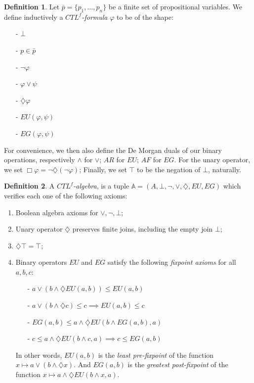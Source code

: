 \documentclass[11pt]{article}
\newcommand{\A}{{\mathbb{A}}}
\newcommand{\dia}{{\diamondsuit}}
\theoremstyle{definition}
\newtheorem*{definition}{Definition}
\begin{document}
\begin{definition}\label{CTLf_formulas}
    Let $\bar{p}= \{p_1,\ldots,p_n \}$ be a finite set of propositional variables. We define inductively 
    a \emph{$CTL^{f}$-formula} $\varphi$ to be of the shape:
    \begin{itemize}
        \setlength\itemsep{0em}
        \item[-] $\bot$
        \item[-] $p \in \bar{p}$
        \item[-] $\neg \varphi$
        \item[-] $\varphi \vee \psi$
        \item[-] $\dia \varphi$
        \item[-] $EU(\varphi,\psi)$
        \item[-] $EG(\varphi,\psi)$ 
    \end{itemize}
    For convenience, we then also define the De Morgan duals of our binary operations, respectively $\wedge$ for $\vee$; $AR$ for $EU$; $AF$ for $EG$. For the unary operator, we set $\Box \varphi = \neg \dia(\neg \varphi)$; Finally, we set $\top$ to be the negation of $\bot$, naturally.
\end{definition}

\begin{definition}\label{CTLf-algebra}
    A \emph{$CTL^f$-algebra}, is a tuple $\A=(A,\bot,\neg,\vee,\dia,EU,EG)$ which verifies each one of the following axioms:
    \begin{enumerate}
        \setlength\itemsep{0em}
        \item Boolean algebra axioms for $\vee,\neg,\bot$;
        \item Unary operator $\dia$ preserves finite joins, including the empty join $\bot$;
        \item $\dia \top = \top$;
        \item Binary operators $EU$ and $EG$ satisfy the following \emph{fixpoint axioms} for all $a,b,c$:
        \begin{itemize}
            \item[-] $a \vee (b \wedge \dia EU(a,b)) \leq EU(a,b)$
            \item[-] $a \vee (b \wedge \dia c) \leq c \implies EU(a,b) \leq c$ 
            \item[-] $EG(a,b)\leq a\wedge \dia EU(b\wedge EG(a,b),a)$
            \item[-] $c\leq a\wedge \dia EU(b\wedge c,a) \implies c \leq EG(a,b)$
        \end{itemize}
        In other words, $EU(a,b)$ is the \emph{least pre-fixpoint} of the function $x \mapsto a \vee (b \wedge \dia x)$.
        And $EG(a,b)$ is the \emph{greatest post-fixpoint} of the function $x \mapsto a\wedge \dia EU(b\wedge x,a)$.
    \end{enumerate}
\end{definition}
\end{document}
